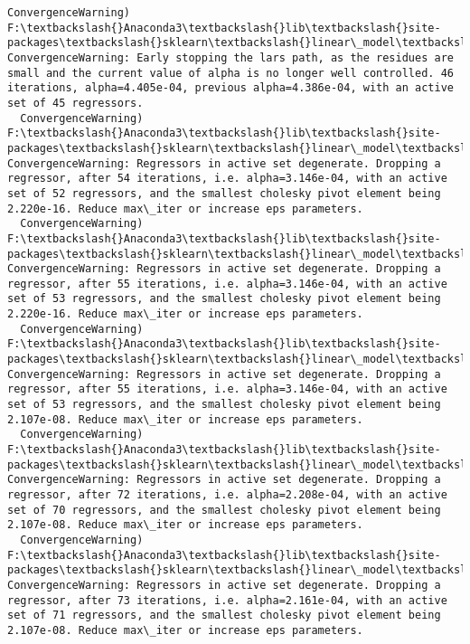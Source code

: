 \documentclass[11pt]{article}
\begin{document}
\begin{Verbatim}[commandchars=\\\{\}]
  ConvergenceWarning)
F:\textbackslash{}Anaconda3\textbackslash{}lib\textbackslash{}site-packages\textbackslash{}sklearn\textbackslash{}linear\_model\textbackslash{}least\_angle.py:339: ConvergenceWarning: Early stopping the lars path, as the residues are small and the current value of alpha is no longer well controlled. 46 iterations, alpha=4.405e-04, previous alpha=4.386e-04, with an active set of 45 regressors.
  ConvergenceWarning)
F:\textbackslash{}Anaconda3\textbackslash{}lib\textbackslash{}site-packages\textbackslash{}sklearn\textbackslash{}linear\_model\textbackslash{}least\_angle.py:313: ConvergenceWarning: Regressors in active set degenerate. Dropping a regressor, after 54 iterations, i.e. alpha=3.146e-04, with an active set of 52 regressors, and the smallest cholesky pivot element being 2.220e-16. Reduce max\_iter or increase eps parameters.
  ConvergenceWarning)
F:\textbackslash{}Anaconda3\textbackslash{}lib\textbackslash{}site-packages\textbackslash{}sklearn\textbackslash{}linear\_model\textbackslash{}least\_angle.py:313: ConvergenceWarning: Regressors in active set degenerate. Dropping a regressor, after 55 iterations, i.e. alpha=3.146e-04, with an active set of 53 regressors, and the smallest cholesky pivot element being 2.220e-16. Reduce max\_iter or increase eps parameters.
  ConvergenceWarning)
F:\textbackslash{}Anaconda3\textbackslash{}lib\textbackslash{}site-packages\textbackslash{}sklearn\textbackslash{}linear\_model\textbackslash{}least\_angle.py:313: ConvergenceWarning: Regressors in active set degenerate. Dropping a regressor, after 55 iterations, i.e. alpha=3.146e-04, with an active set of 53 regressors, and the smallest cholesky pivot element being 2.107e-08. Reduce max\_iter or increase eps parameters.
  ConvergenceWarning)
F:\textbackslash{}Anaconda3\textbackslash{}lib\textbackslash{}site-packages\textbackslash{}sklearn\textbackslash{}linear\_model\textbackslash{}least\_angle.py:313: ConvergenceWarning: Regressors in active set degenerate. Dropping a regressor, after 72 iterations, i.e. alpha=2.208e-04, with an active set of 70 regressors, and the smallest cholesky pivot element being 2.107e-08. Reduce max\_iter or increase eps parameters.
  ConvergenceWarning)
F:\textbackslash{}Anaconda3\textbackslash{}lib\textbackslash{}site-packages\textbackslash{}sklearn\textbackslash{}linear\_model\textbackslash{}least\_angle.py:313: ConvergenceWarning: Regressors in active set degenerate. Dropping a regressor, after 73 iterations, i.e. alpha=2.161e-04, with an active set of 71 regressors, and the smallest cholesky pivot element being 2.107e-08. Reduce max\_iter or increase eps parameters.

\end{Verbatim}
\end{document}
